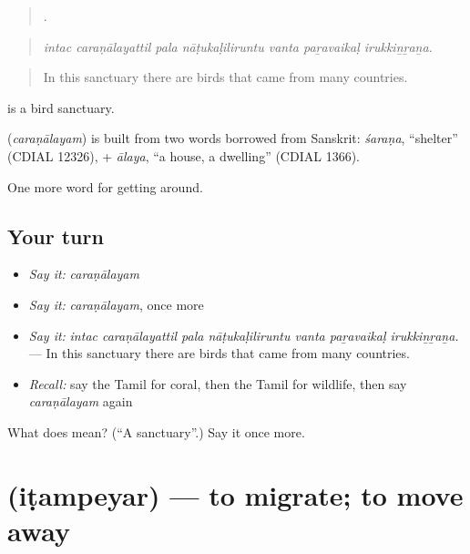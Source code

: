 \begin{quote}
      .
\end{quote}

\begin{quote}
\emph{intac caraṇālayattil pala nāṭukaḷiliruntu vanta paṟavaikaḷ irukkiṉṟaṉa.}
\end{quote}

\begin{quote}
In this sanctuary there are birds that came from many countries.
\end{quote}

  is a bird sanctuary.

\begin{cousinweb}
\textbf{} (\emph{caraṇālayam}) is built from two words borrowed from Sanskrit: \emph{śaraṇa}, \textquotedblleft{}shelter\textquotedblright{} (CDIAL 12326), + \emph{ālaya}, \textquotedblleft{}a house, a dwelling\textquotedblright{} (CDIAL 1366).
\end{cousinweb}

\begin{grammarlens}[title={What you've built}]
One more word for getting around.
\end{grammarlens}

\subsection*{Your turn}
\begin{itemize}
\raggedright
  \item \emph{Say it:} \emph{caraṇālayam}
  \item \emph{Say it:} \emph{caraṇālayam}, once more
  \item \emph{Say it:} \emph{intac caraṇālayattil pala nāṭukaḷiliruntu vanta paṟavaikaḷ irukkiṉṟaṉa.} — In this sanctuary there are birds that came from many countries.
  \item \emph{Recall:} say the Tamil for coral, then the Tamil for wildlife, then say \emph{caraṇālayam} again
\end{itemize}

\begin{tcolorbox}[breakable,colback=teal!4,colframe=teal!35!black,title={Before you move on}]
What does  mean? (\textquotedblleft{}A sanctuary\textquotedblright{}.) Say it once more.
\end{tcolorbox}
\section[\texorpdfstring{\ta{இடம்பெயர்} (iṭampeyar)}{இடம்பெயர் (iṭampeyar)}]{ (iṭampeyar) — to migrate; to move away}

